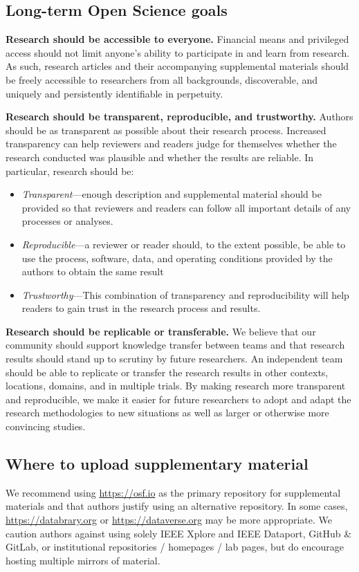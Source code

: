 \documentclass[journal]{vgtc}                     %
\begin{document}
\subsection{Long-term Open Science goals}

\textbf{Research should be accessible to everyone.}
Financial means and privileged access should not limit anyone's ability to participate in and learn from research.
As such, research articles and their accompanying supplemental materials should be freely accessible to researchers from all backgrounds, discoverable, and uniquely and persistently identifiable in perpetuity.

\textbf{Research should be transparent, reproducible, and trustworthy.}
Authors should be as transparent as possible about their research process.
Increased transparency can help reviewers and readers judge for themselves whether the research conducted was plausible and whether the results are reliable.
In particular, research should be:
\begin{itemize}
  \item \textit{Transparent}---enough description and supplemental material should be provided so that reviewers and readers can follow all important details of any processes or analyses.

  \item \textit{Reproducible}---a reviewer or reader should, to the extent possible, be able to use the process, software, data, and operating conditions provided by the authors to obtain the same result

  \item \textit{Trustworthy}---This combination of transparency and reproducibility will help readers to gain trust in the research process and results.
\end{itemize}

\textbf{Research should be replicable or transferable.}
We believe that our community should support knowledge transfer between teams and that research results should stand up to scrutiny by future researchers. An independent team should be able to replicate or transfer the research results in other contexts, locations, domains, and in multiple trials. By making research more transparent and reproducible, we make it easier for future researchers to adopt and adapt the research methodologies to new situations as well as larger or otherwise more convincing studies.

\subsection{Where to upload supplementary material}
We recommend using \url{https://osf.io} as the primary repository for supplemental materials and that authors justify using an alternative repository.
In some cases, \url{https://databrary.org} or \url{https://dataverse.org} may be more appropriate.
We caution authors against using solely IEEE Xplore and IEEE Dataport, GitHub \& GitLab, or institutional repositories / homepages / lab pages, but do encourage hosting multiple mirrors of material.
\end{document}
